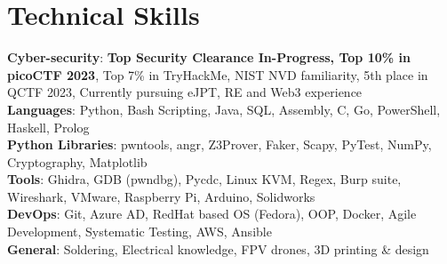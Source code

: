 \section{Technical Skills}

\begin{itemize}[leftmargin=0.15in, label={}]
    \small{\item{
        \textbf{Cyber-security}{: \textbf{Top Security Clearance In-Progress, Top 10\% in picoCTF 2023}, Top 7\% in TryHackMe, NIST NVD familiarity, 5th place in QCTF 2023, Currently pursuing eJPT, RE and Web3 experience} \\ \vspace{1.5mm}
        \textbf{Languages}{: Python, Bash Scripting, Java, SQL, Assembly, C, Go, PowerShell, Haskell, Prolog} \\ \vspace{1.5mm}
        \textbf{Python Libraries}{: pwntools, angr, Z3Prover, Faker, Scapy, PyTest, NumPy, Cryptography, Matplotlib} \\ \vspace{1.5mm}
        \textbf{Tools}{: Ghidra, GDB (pwndbg), Pycdc, Linux KVM, Regex, Burp suite, Wireshark, VMware, Raspberry Pi, Arduino, Solidworks} \\ \vspace{1.5mm}
        \textbf{DevOps}{: Git, Azure AD, RedHat based OS (Fedora), OOP, Docker, Agile Development, Systematic Testing, AWS, Ansible}\\ \vspace{1.5mm}
        \textbf{General}{: Soldering, Electrical knowledge, FPV drones, 3D printing \& design}\\
    }}
\end{itemize}